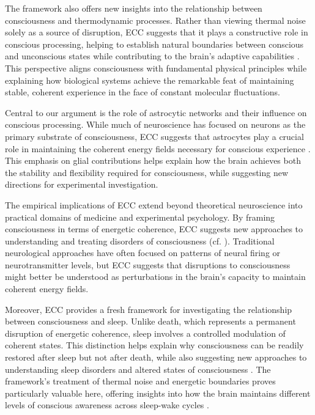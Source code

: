 \begin{refsection}
The framework also offers new insights into the relationship between consciousness and thermodynamic processes. Rather than viewing thermal noise solely as a source of disruption, ECC suggests that it plays a constructive role in conscious processing, helping to establish natural boundaries between conscious and unconscious states while contributing to the brain's adaptive capabilities \cite{prigogine2018order}. This perspective aligns consciousness with fundamental physical principles while explaining how biological systems achieve the remarkable feat of maintaining stable, coherent experience in the face of constant molecular fluctuations.

Central to our argument is the role of astrocytic networks and their influence on conscious processing. While much of neuroscience has focused on neurons as the primary substrate of consciousness, ECC suggests that astrocytes play a crucial role in maintaining the coherent energy fields necessary for conscious experience \cite{Bazargani2016}. This emphasis on glial contributions helps explain how the brain achieves both the stability and flexibility required for consciousness, while suggesting new directions for experimental investigation.

The empirical implications of ECC extend beyond theoretical neuroscience into practical domains of medicine and experimental psychology. By framing consciousness in terms of energetic coherence, ECC suggests new approaches to understanding and treating disorders of consciousness (cf. \cite{tononi2015consciousness}). Traditional neurological approaches have often focused on patterns of neural firing or neurotransmitter levels, but ECC suggests that disruptions to consciousness might better be understood as perturbations in the brain's capacity to maintain coherent energy fields.

Moreover, ECC provides a fresh framework for investigating the relationship between consciousness and sleep. Unlike death, which represents a permanent disruption of energetic coherence, sleep involves a controlled modulation of coherent states. This distinction helps explain why consciousness can be readily restored after sleep but not after death, while also suggesting new approaches to understanding sleep disorders and altered states of consciousness \cite{Dittrich2010}. The framework's treatment of thermal noise and energetic boundaries proves particularly valuable here, offering insights into how the brain maintains different levels of conscious awareness across sleep-wake cycles \cite{prigogine2018order}.


\end{refsection}

